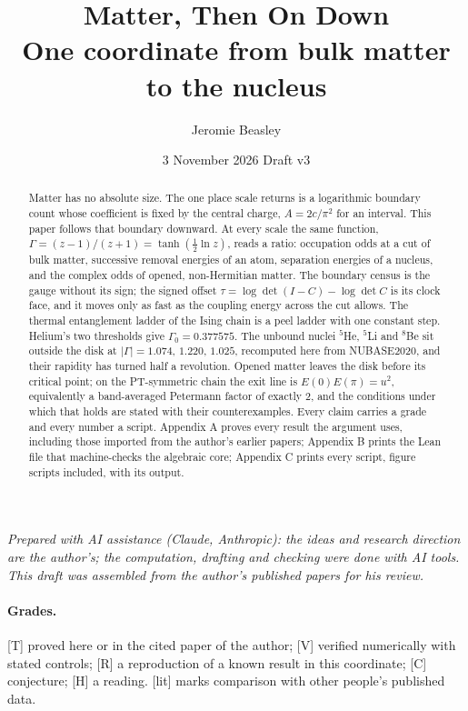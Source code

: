 \documentclass[11pt]{article}
\title{Matter, Then On Down\\[4pt]\large One coordinate from bulk matter to the nucleus}
\author{Jeromie Beasley}
\date{3 November 2026 \quad Draft v3}
\theoremstyle{definition}
\newcommand{\grade}[1]{\textsf{\small[#1]}}
\begin{document}
\maketitle

\noindent\emph{Prepared with AI assistance (Claude, Anthropic): the ideas and research direction are the author's; the computation, drafting and checking were done with AI tools. This draft was assembled from the author's published papers for his review.}

\begin{abstract}
Matter has no absolute size. The one place scale returns is a logarithmic boundary count whose coefficient is fixed by the central charge, $A=2c/\pi^2$ for an interval. This paper follows that boundary downward. At every scale the same function, $\Gamma=(z-1)/(z+1)=\tanh(\tfrac12\ln z)$, reads a ratio: occupation odds at a cut of bulk matter, successive removal energies of an atom, separation energies of a nucleus, and the complex odds of opened, non-Hermitian matter. The boundary census is the gauge without its sign; the signed offset $\tau=\log\det(I-C)-\log\det C$ is its clock face, and it moves only as fast as the coupling energy across the cut allows. The thermal entanglement ladder of the Ising chain is a peel ladder with one constant step. Helium's two thresholds give $\Gamma_0=0.377575$. The unbound nuclei ${}^5$He, ${}^5$Li and ${}^8$Be sit outside the disk at $|\Gamma|=1.074$, $1.220$, $1.025$, recomputed here from NUBASE2020, and their rapidity has turned half a revolution. Opened matter leaves the disk before its critical point; on the PT-symmetric chain the exit line is $E(0)E(\pi)=u^2$, equivalently a band-averaged Petermann factor of exactly 2, and the conditions under which that holds are stated with their counterexamples. Every claim carries a grade and every number a script. Appendix A proves every result the argument uses, including those imported from the author's earlier papers; Appendix B prints the Lean file that machine-checks the algebraic core; Appendix C prints every script, figure scripts included, with its output.
\end{abstract}

\paragraph{Grades.} \grade{T} proved here or in the cited paper of the author; \grade{V} verified numerically with stated controls; \grade{R} a reproduction of a known result in this coordinate; \grade{C} conjecture; \grade{H} a reading. \grade{lit} marks comparison with other people's published data.
\end{document}
